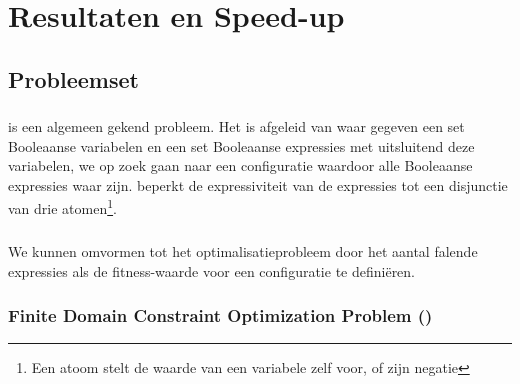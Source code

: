 \chapter{Resultaten en Speed-up}
\label{hoofdstuk:4}



\section{Probleemset}

\subsection{}

 is een algemeen gekend probleem. Het is afgeleid van  waar gegeven een set Booleaanse variabelen en een set Booleaanse expressies met uitsluitend deze variabelen, we op zoek gaan naar een configuratie waardoor alle Booleaanse expressies waar zijn.  beperkt de expressiviteit van de expressies tot een disjunctie van drie atomen\footnote{Een atoom stelt de waarde van een variabele zelf voor, of zijn negatie}.

\paragraph{}
We kunnen  omvormen tot het optimalisatieprobleem  door het aantal falende expressies als de fitness-waarde voor een configuratie te defini\"eren.

\subsection{Finite Domain Constraint Optimization Problem ()}